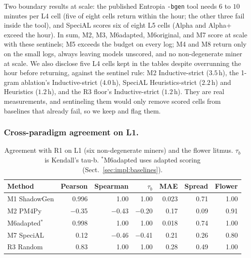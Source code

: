 \documentclass[runningheads]{llncs}
\newcommand{\chg}[1]{#1}
\begin{document}
\chg{Two boundary results at scale: the published Entropia \texttt{-bgen} tool needs $6$ to $10$ minutes per L4 cell (five of eight cells return within the hour; the other three fail inside the tool), and SpeciAL scores six of eight L5 cells (Alpha and Alpha+ exceed the hour). In sum, M2, M3, M6adapted, M6original, and M7 score at scale with these sentinels; M5 exceeds the budget on every log; M4 and M8 return only on the small logs, always leaving models unscored, and no non-degenerate miner at scale. We also disclose five L4 cells kept in the tables despite overrunning the hour before returning, against the sentinel rule: M2 Inductive-strict ($3.5$\,h), the 1-gram ablation's Inductive-strict ($4.0$\,h), SpeciAL Heuristics-strict ($2.2$\,h) and Heuristics ($1.2$\,h), and the R3 floor's Inductive-strict ($1.2$\,h). They are real measurements, and sentineling them would only remove scored cells from baselines that already fail, so we keep and flag them.}

\subsubsection{Cross-paradigm agreement on L1.}
\label{sec:eval:external}


\begin{table}[t]
\centering
\caption{Agreement with R1 on L1 (six non-degenerate miners) and the flower litmus. $\tau_b$ is Kendall's tau-b. \chg{$^{*}$M6adapted uses adapted scoring (Sect.~\ref{sec:impl:baselines}).}}
\label{tab:corr}
\setlength{\tabcolsep}{4.5pt}
\footnotesize
\begin{tabular}{@{}lrrrrrr@{}}
\toprule
Method & Pearson & Spearman & $\tau_b$ & MAE & Spread & Flower \\
\midrule
M1 ShadowGen  & 0.996 & 1.00 & 1.00 & 0.023 & 0.71 & 1.00 \\
M2 PM4Py         & $-$0.35 & $-$0.43 & $-$0.20 & 0.17 & 0.09 & 0.91 \\
M6adapted$^{*}$ & 0.998 & 1.00 & 1.00 & 0.018 & 0.74 & 1.00 \\
M7 SpeciAL       & 0.12 & $-$0.46 & $-$0.41 & 0.21 & 0.26 & 0.80 \\
R3 Random        & 0.83 & 1.00 & 1.00 & 0.28 & 0.49 & 1.00 \\
\bottomrule
\end{tabular}
\end{table}
\end{document}
